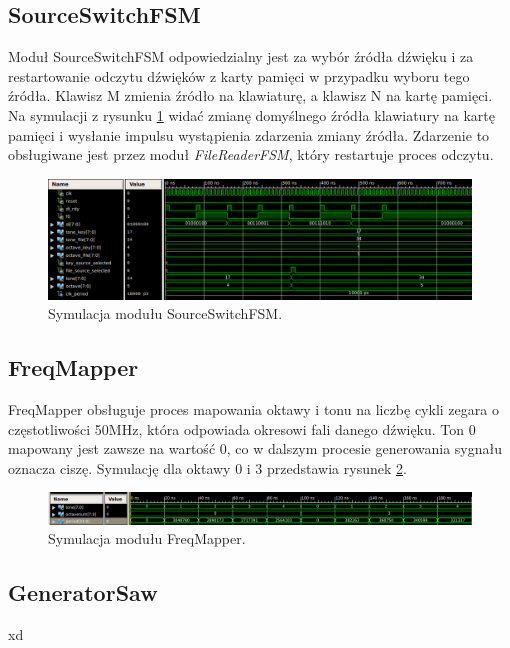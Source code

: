 \documentclass[12pt]{article}
\begin{document}
\subsection{SourceSwitchFSM}
Moduł SourceSwitchFSM odpowiedzialny jest za wybór źródła dźwięku i za restartowanie odczytu dźwięków z karty pamięci w przypadku wyboru tego źródła. Klawisz M zmienia źródło na klawiaturę, a klawisz N na kartę pamięci. Na symulacji z rysunku \ref{sim:source} widać zmianę domyślnego źródła klawiatury na kartę pamięci i wysłanie impulsu wystąpienia zdarzenia zmiany źródła. Zdarzenie to obsługiwane jest przez moduł \textit{FileReaderFSM}, który restartuje proces odczytu.
\begin{figure}[h]
  \centering
  \includegraphics[decodearray={1 0 1 0 1 0}, width=\linewidth]{images/source}
  \caption{Symulacja modułu SourceSwitchFSM.}
  \label{sim:source}
\end{figure}
\subsection{FreqMapper}
FreqMapper obsługuje proces mapowania oktawy i tonu na liczbę cykli zegara o częstotliwości 50MHz, która odpowiada okresowi fali danego dźwięku. Ton 0 mapowany jest zawsze na wartość 0, co w dalszym procesie generowania sygnału oznacza ciszę. Symulację dla oktawy 0 i 3 przedstawia rysunek \ref{sim:mapper}.
\begin{figure}[h]
  \centering
  \includegraphics[decodearray={1 0 1 0 1 0}, width=\linewidth]{images/mapper}
  \caption{Symulacja modułu FreqMapper.}
  \label{sim:mapper}
\end{figure}

\subsection{GeneratorSaw}
xd
\end{document}
